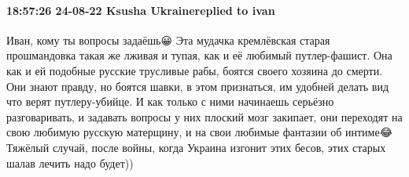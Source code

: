  
 
 
 
 

\paragraph{18:57:26 24-08-22 Ksusha Ukrainereplied to ivan}

Иван, кому ты вопросы задаёшь😀
Эта мудачка кремлёвская старая прошмандовка такая же лживая и тупая, как и её любимый путлер-фашист. Она как и ей подобные русские трусливые рабы, боятся своего хозяина до смерти. Они знают правду, но боятся шавки, в этом признаться, им удобней делать вид что верят путлеру-убийце.
И как только с ними начинаешь серьёзно разговаривать, и задавать вопросы у них плоский мозг закипает, они переходят на свою любимую русскую матерщину, и на свои любимые фантазии об интиме😂
Тяжёлый случай, после войны, когда Украина изгонит этих бесов, этих старых шалав лечить надо будет))
